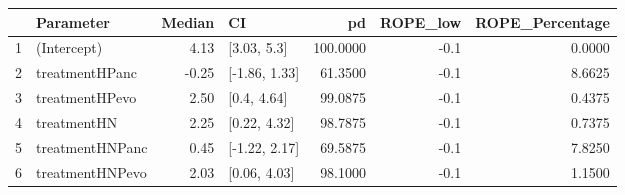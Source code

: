 \begin{table}[ht]
\centering
\begin{tabular}{llrlrrr}
  \hline
 & Parameter & Median & CI & pd & ROPE\_low & ROPE\_Percentage \\ 
  \hline
1 & (Intercept) & 4.13 & [3.03, 5.3] & 100.0000 & -0.1 & 0.0000 \\ 
  2 & treatmentHPanc & -0.25 & [-1.86, 1.33] & 61.3500 & -0.1 & 8.6625 \\ 
  3 & treatmentHPevo & 2.50 & [0.4, 4.64] & 99.0875 & -0.1 & 0.4375 \\ 
  4 & treatmentHN & 2.25 & [0.22, 4.32] & 98.7875 & -0.1 & 0.7375 \\ 
  5 & treatmentHNPanc & 0.45 & [-1.22, 2.17] & 69.5875 & -0.1 & 7.8250 \\ 
  6 & treatmentHNPevo & 2.03 & [0.06, 4.03] & 98.1000 & -0.1 & 1.1500 \\ 
   \hline
\end{tabular}
\end{table}


